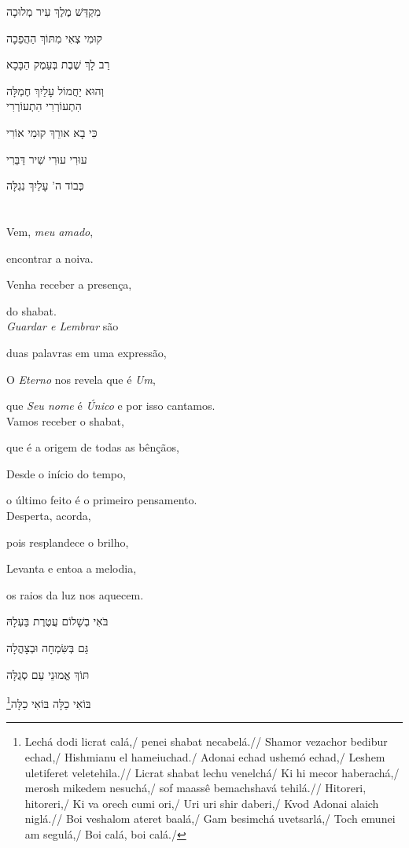 מִקְדַּשׁ מֶלֶךְ עִיר מְלוּכָה

קוּמִי צְאִי מִתּוֹךְ הַהֲפֵכָה

רַב לָךְ שֶׁבֶת בְּעֵמֶק הַבָּכָא

וְהוּא יַחֲמוֹל עָלַיִךְ חֶמְלָּה\\[10pt]

הִתְעוֹרְרִי הִתְעוֹרְרִי

כִּי בָא אורֵךְ קוּמִי אוֹרִי

עוּרִי עוּרִי שִׁיר דַּבֵּרִי

כְּבוֹד ה' עָלַיִךְ נִגְלָּה


\movetooddpage
\raggedright

\section{}

Vem, \emph{meu amado},

encontrar a noiva.

Venha receber a presença,

do shabat.\\[10pt]

\emph{Guardar e Lembrar} são

duas palavras em uma expressão,

O \emph{Eterno} nos revela que é \emph{Um},

que \emph{Seu nome} é \emph{Único} e por isso cantamos.\\[10pt]

Vamos receber o shabat,

que é a origem de todas as bênçãos,

Desde o início do tempo,

o último feito é o primeiro pensamento.\\[10pt]

Desperta, acorda,

pois resplandece o brilho,

Levanta e entoa a melodia,

os raios da luz nos aquecem.

\movetoevenpage
\raggedleft

בֹּאִי בְשָׁלוֹם עֲטֶרֶת בַּעְלָהּ

גַּם בְּשִּׂמְחָה וּבְצָהֳלָה

תּוֹךְ אֱמוּנֵי עַם סְגֻלָּה

בּוֹאִי כַלָּה בּוֹאִי כַלָּה\footnote{Lechá dodi licrat calá,/ penei shabat necabelá.// Shamor vezachor bedibur echad,/ Hishmianu el hameiuchad./ Adonai echad ushemó echad,/ Leshem uletiferet veletehila.//
Licrat shabat lechu venelchá/ Ki hi mecor haberachá,/ merosh mikedem nesuchá,/ sof maassê bemachshavá tehilá.// Hitoreri, hitoreri,/ Ki va orech cumi ori,/ Uri uri shir daberi,/
Kvod Adonai alaich niglá.// Boi veshalom ateret baalá,/ Gam besimchá uvetsarlá,/
Toch emunei am segulá,/ Boi calá, boi calá./}

